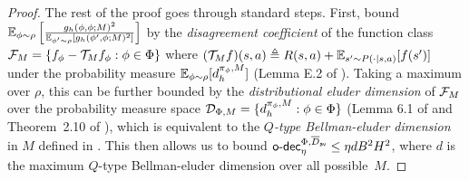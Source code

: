 \begin{proof}
    The rest of the proof goes through standard steps. First, bound $\mathbb{E}_{\phi\sim \rho} \left[\frac{g_h(\phi, \phi; M)^2}{\mathbb{E}_{\phi'\sim \rho} \left[g_h(\phi', \phi; M)^2\right]}\right]$ by the \emph{disagreement coefficient} of the function class $\mathcal{F}_M = \left\{f_\phi - \mathcal{T}_M f_\phi: \phi\in\Phi \right\}$ where $(\mathcal{T}_M f)(s,a) \triangleq R(s,a) + \mathbb{E}_{s'\sim P(\cdot|s,a)}[f(s')]$ under the probability measure $\mathbb{E}_{\phi\sim \rho}[d_h^{\pi_\phi, M}]$ (Lemma E.2 of \cite{foster2021statistical}). Taking a maximum over $\rho$, this can be further bounded by the \emph{distributional eluder dimension} of $\mathcal{F}_M$ over the probability measure space $\mathcal{D}_{\Phi, M} = \{d_h^{\pi_\phi, M}: \phi\in\Phi\}$ (Lemma 6.1 of \cite{foster2021statistical} and Theorem~2.10 of \cite{foster2021instance}), which is equivalent to the \emph{$Q$-type Bellman-eluder dimension} in $M$ defined in \cite{jin2021bellman}. This then allows us to bound $\mathsf{o}\text{-}\mathsf{dec}_\eta^{\Phi, \overline{D}_{\mathsf{av}}}\leq \eta dB^2H^2$, where $d$ is the maximum $Q$-type Bellman-eluder dimension over all possible~$M$. 


\end{proof}
